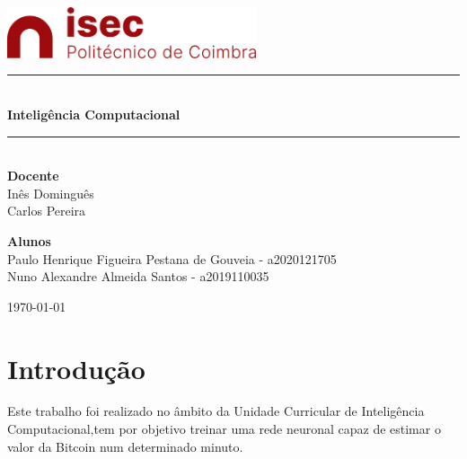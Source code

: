 \documentclass[10pt]{article}
\newcommand{\HRule}{\rule{\linewidth}{0.5mm}}
\begin{document}
\begin{titlepage}
\begin{center}

\includegraphics[width=0.55\textwidth]{img/logo-isec-transparente.png}~\\[2cm]


\HRule \\[0.4cm]
{ \LARGE 
  \textbf{Inteligência Computacional}\\[0.4cm]
}
\HRule \\[1.5cm]

{ \large
  \textbf{Docente} \\[0.1cm]
  Inês Dominguês \\ Carlos Pereira \\[2.5cm]
}


{ \large
  \textbf{Alunos} \\[0.1cm]
  Paulo Henrique Figueira Pestana de Gouveia - a2020121705 \\[0.1cm]
  Nuno Alexandre Almeida Santos - a2019110035\\[0.1cm]
}

\vfill



{\large \today}
 
\end{center}
\end{titlepage}


\newpage



\tableofcontents
{}
\newpage
\setcounter{page}{1}

\large
\section{Introdução}\label{sec:intro}
Este trabalho foi realizado no âmbito da Unidade Curricular 
de Inteligência Computacional,tem por objetivo treinar uma rede 
neuronal capaz de estimar o valor da Bitcoin num determinado minuto.
\end{document}

